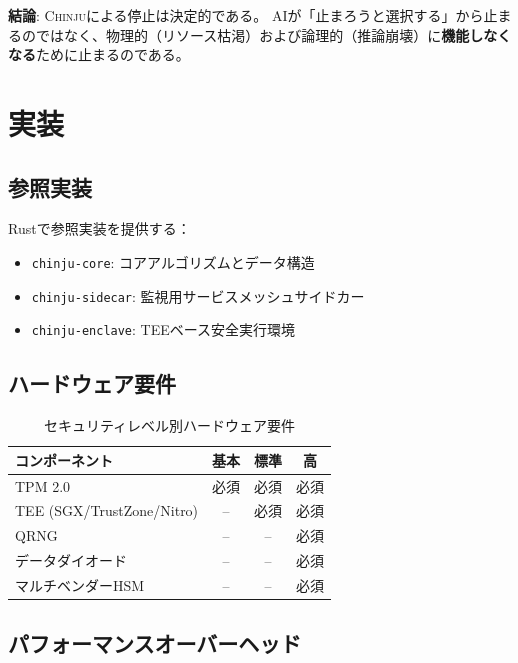 \documentclass[11pt,a4paper]{article}
\newcommand{\chinju}{\textsc{Chinju}}
\begin{document}
\textbf{結論}: \chinju{}による停止は決定的である。
AIが「止まろうと選択する」から止まるのではなく、物理的（リソース枯渇）および論理的（推論崩壊）に\textbf{機能しなくなる}ために止まるのである。

\section{実装}
\label{sec:implementation}

\subsection{参照実装}

Rustで参照実装を提供する：

\begin{itemize}
    \item \texttt{chinju-core}: コアアルゴリズムとデータ構造
    \item \texttt{chinju-sidecar}: 監視用サービスメッシュサイドカー
    \item \texttt{chinju-enclave}: TEEベース安全実行環境
\end{itemize}

\subsection{ハードウェア要件}

\begin{table}[htbp]
\centering
\caption{セキュリティレベル別ハードウェア要件}
\label{tab:hardware}
\begin{tabular}{@{}lccc@{}}
\toprule
コンポーネント & 基本 & 標準 & 高 \\
\midrule
TPM 2.0 & 必須 & 必須 & 必須 \\
TEE (SGX/TrustZone/Nitro) & -- & 必須 & 必須 \\
QRNG & -- & -- & 必須 \\
データダイオード & -- & -- & 必須 \\
マルチベンダーHSM & -- & -- & 必須 \\
\bottomrule
\end{tabular}
\end{table}

\subsection{パフォーマンスオーバーヘッド}
\end{document}
